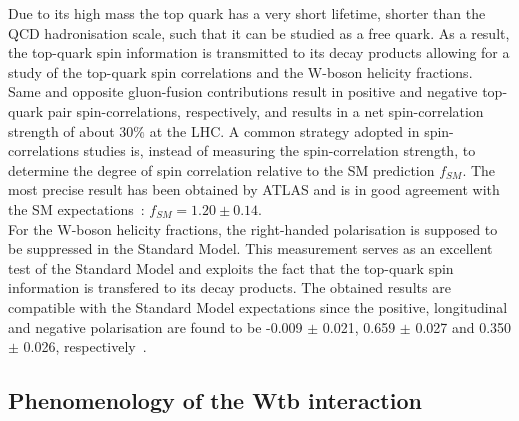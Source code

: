 Due to its high mass the top quark has a very short lifetime, shorter than the QCD hadronisation scale, such that it can be studied as a free quark. As a result, the top-quark spin information is transmitted to its decay products allowing for a study of the top-quark spin correlations and the W-boson helicity fractions.
\\
Same and opposite gluon-fusion contributions result in positive and negative top-quark pair spin-correlations, respectively, and results in a net spin-correlation strength of about $30 \%$ at the LHC.
A common strategy adopted in spin-correlations studies is, instead of measuring the spin-correlation strength, to determine the degree of spin correlation relative to the SM prediction $f_{SM}$. 
The most precise result has been obtained by ATLAS and is in good agreement with the SM expectations~\cite{AtlasSpinCorr}: $f_{SM} = 1.20 \pm 0.14$.
\\
For the W-boson helicity fractions, the right-handed polarisation is supposed to be suppressed in the Standard Model.
This measurement serves as an excellent test of the Standard Model and exploits the fact that the top-quark spin information is transfered to its decay products.
The obtained results are compatible with the Standard Model expectations since the positive, longitudinal and negative polarisation are found to be -0.009 $\pm$ 0.021, 0.659 $\pm$ 0.027 and 0.350 $\pm$ 0.026, respectively~\cite{CMSWHelicity}.

\subsection{Phenomenology of the Wtb interaction} \label{sec::SubWtb}


